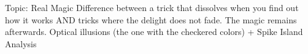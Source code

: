 Topic: Real Magic
		Difference between a trick that dissolves when you find out how it works AND tricks where the delight does not fade.
		The magic remains afterwards. Optical illusions (the one with the checkered colors) + Spike Island Analysis
